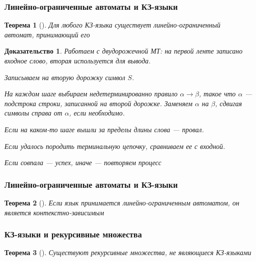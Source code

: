 \documentclass{beamer}
\newtheorem{rutheorem}{Теорема}
\newtheorem{ruproof}{Доказательство}
\begin{document}
\begin{frame}[fragile]
  \transwipe[direction=90]
  \frametitle{Линейно-ограниченные автоматы и КЗ-языки}
  \begin{rutheorem}[]
    Для любого КЗ-языка существует линейно-ограниченный автомат, принимающий его
  \end{rutheorem}

  \begin{ruproof}
   Работаем с двудорожечной МТ: на первой ленте записано входное слово, вторая используется для вывода.

   Записываем на вторую дорожку символ $S$.

   На каждом шаге выбираем недетерминированно правило $\alpha \rightarrow \beta$, такое что $\alpha$ --- подстрока строки, записанной на второй дорожке. Заменяем $\alpha$ на $\beta$, сдвигая символы справа от $\alpha$, если необходимо.

   Если на каком-то шаге вышли за пределы длины слова --- провал.

   Если удалось породить терминальную цепочку, сравниваем ее с входной.

   Если совпала --- успех, иначе --- повторяем процесс
  \end{ruproof}

\end{frame}

\begin{frame}[fragile]
  \transwipe[direction=90]
  \frametitle{Линейно-ограниченные автоматы и КЗ-языки}
  \begin{rutheorem}[]
    Если язык принимается линейно-ограниченным автоматом, он является контекстно-зависимым
  \end{rutheorem}
\end{frame}

\begin{frame}[fragile]
  \transwipe[direction=90]
  \frametitle{КЗ-языки и рекурсивные множества}
  \begin{rutheorem}[]
    Существуют рекурсивные множества, не являющиеся КЗ-языками
  \end{rutheorem}
\end{frame}
\end{document}
